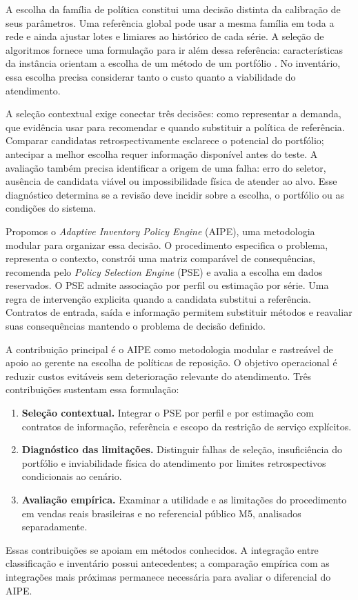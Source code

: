 \documentclass[preprint,12pt]{elsarticle}
\begin{document}
A escolha da família de política constitui uma decisão distinta da calibração de seus parâmetros. Uma referência global pode usar a mesma família em toda a rede e ainda ajustar lotes e limiares ao histórico de cada série. A seleção de algoritmos fornece uma formulação para ir além dessa referência: características da instância orientam a escolha de um método de um portfólio \cite{rice1976,Kotthoff2014AlgorithmSelection}. No inventário, essa escolha precisa considerar tanto o custo quanto a viabilidade do atendimento.

A seleção contextual exige conectar três decisões: como representar a demanda, que evidência usar para recomendar e quando substituir a política de referência. Comparar candidatas retrospectivamente esclarece o potencial do portfólio; antecipar a melhor escolha requer informação disponível antes do teste. A avaliação também precisa identificar a origem de uma falha: erro do seletor, ausência de candidata viável ou impossibilidade física de atender ao alvo. Esse diagnóstico determina se a revisão deve incidir sobre a escolha, o portfólio ou as condições do sistema.

Propomos o \textit{Adaptive Inventory Policy Engine} (AIPE), uma metodologia modular para organizar essa decisão. O procedimento especifica o problema, representa o contexto, constrói uma matriz comparável de consequências, recomenda pelo \textit{Policy Selection Engine} (PSE) e avalia a escolha em dados reservados. O PSE admite associação por perfil ou estimação por série. Uma regra de intervenção explicita quando a candidata substitui a referência. Contratos de entrada, saída e informação permitem substituir métodos e reavaliar suas consequências mantendo o problema de decisão definido.

A contribuição principal é o AIPE como metodologia modular e rastreável de apoio ao gerente na escolha de políticas de reposição. O objetivo operacional é reduzir custos evitáveis sem deterioração relevante do atendimento. Três contribuições sustentam essa formulação:
\begin{enumerate}
 \item \textbf{Seleção contextual.} Integrar o PSE por perfil e por estimação com contratos de informação, referência e escopo da restrição de serviço explícitos.
 \item \textbf{Diagnóstico das limitações.} Distinguir falhas de seleção, insuficiência do portfólio e inviabilidade física do atendimento por limites retrospectivos condicionais ao cenário.
 \item \textbf{Avaliação empírica.} Examinar a utilidade e as limitações do procedimento em vendas reais brasileiras e no referencial público M5, analisados separadamente.
\end{enumerate}
Essas contribuições se apoiam em métodos conhecidos. A integração entre classificação e inventário possui antecedentes; a comparação empírica com as integrações mais próximas permanece necessária para avaliar o diferencial do AIPE.
\end{document}

